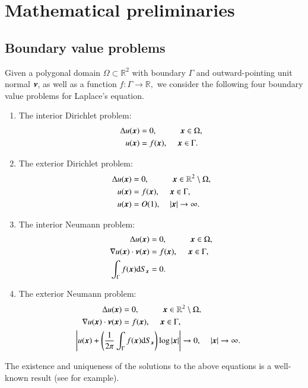 \section{Mathematical preliminaries \label{sec:mprelim}}
\subsection{Boundary value problems}
Given a polygonal domain  $\Omega \subset \mathbb{R}^2$ with boundary $\Gamma$ and outward-pointing 
unit normal $\boldsymbol{\nu}$, as well as a function 
$f: \Gamma \to \mathbb{R},$ we consider 
the following four boundary value problems for Laplace's equation. 

\begin{enumerate}
\item The interior Dirichlet problem:
\begin{align}\label{eqn:BVPIDL}
\Delta u(\boldsymbol{x}) &= 0, \hspace{1 cm} \boldsymbol{x} \in \Omega,\\
u(\boldsymbol{x}) &= f(\boldsymbol{x}), \hspace{0.43 cm} \boldsymbol{x} \in \Gamma.
\end{align}

\item The exterior Dirichlet problem:
\begin{align}\label{eqn:BVPEDL}
\Delta u(\boldsymbol{x}) &= 0, \hspace{1 cm} \boldsymbol{x} \in \mathbb{R}^2\setminus\Omega,\\
u(\boldsymbol{x}) &= f(\boldsymbol{x}), \hspace{0.43 cm}\boldsymbol{x} \in \Gamma, \\
u(\boldsymbol{x}) &= O(1) , \hspace{0.4cm} |\boldsymbol{x}| \to \infty.
\end{align}

\item The interior Neumann problem:
\begin{align}\label{eqn:BVPINL}
\Delta u(\boldsymbol{x}) &= 0, \hspace{1 cm} \boldsymbol{x} \in \Omega,\\
\nabla u(\boldsymbol{x})\cdot \boldsymbol{\nu}(\boldsymbol{x})  &= f(\boldsymbol{x}), \hspace{0.45 cm} \boldsymbol{x} \in \Gamma,\\
\int_\Gamma f(\boldsymbol{x}) {\rm d}S_{\boldsymbol{x}} &= 0.
\end{align}

\item The exterior Neumann problem:
\begin{align}\label{eqn:BVPEDL}
\Delta u(\bx) &= 0, \hspace{1 cm} \bx \in \mathbb{R}^2\setminus\Omega,\\
\nabla u(\bx)\cdot \bnu(\bx)  &= f(\bx), \hspace{0.43 cm} \bx \in \Gamma, \\
&\hspace{-2 cm}\left|u(\bx) + \left(\frac{1}{2\pi} \int_\Gamma f(\bx) {\rm d}S_{\bx}\right) \log{|\bx|}\right| \to 0 , \hspace{0.4cm} |\bx| \to \infty.
\end{align}


\end{enumerate}

\begin{remark}
The existence and uniqueness of the solutions to the above equations is a well-known result (see \cite{kress1989linear} for example). 
\end{remark}
